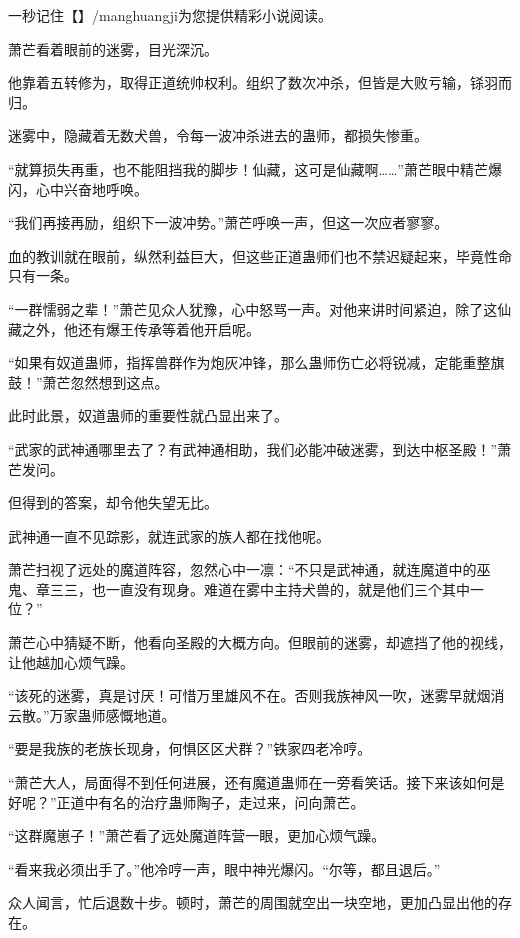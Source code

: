 
\begin{this_body}

一秒记住【】/manghuangji为您提供精彩小说阅读。

萧芒看着眼前的迷雾，目光深沉。

他靠着五转修为，取得正道统帅权利。组织了数次冲杀，但皆是大败亏输，铩羽而归。

迷雾中，隐藏着无数犬兽，令每一波冲杀进去的蛊师，都损失惨重。

“就算损失再重，也不能阻挡我的脚步！仙藏，这可是仙藏啊……”萧芒眼中精芒爆闪，心中兴奋地呼唤。

“我们再接再励，组织下一波冲势。”萧芒呼唤一声，但这一次应者寥寥。

血的教训就在眼前，纵然利益巨大，但这些正道蛊师们也不禁迟疑起来，毕竟性命只有一条。

“一群懦弱之辈！”萧芒见众人犹豫，心中怒骂一声。对他来讲时间紧迫，除了这仙藏之外，他还有爆王传承等着他开启呢。

“如果有奴道蛊师，指挥兽群作为炮灰冲锋，那么蛊师伤亡必将锐减，定能重整旗鼓！”萧芒忽然想到这点。

此时此景，奴道蛊师的重要性就凸显出来了。

“武家的武神通哪里去了？有武神通相助，我们必能冲破迷雾，到达中枢圣殿！”萧芒发问。

但得到的答案，却令他失望无比。

武神通一直不见踪影，就连武家的族人都在找他呢。

萧芒扫视了远处的魔道阵容，忽然心中一凛：“不只是武神通，就连魔道中的巫鬼、章三三，也一直没有现身。难道在雾中主持犬兽的，就是他们三个其中一位？”

萧芒心中猜疑不断，他看向圣殿的大概方向。但眼前的迷雾，却遮挡了他的视线，让他越加心烦气躁。

“该死的迷雾，真是讨厌！可惜万里雄风不在。否则我族神风一吹，迷雾早就烟消云散。”万家蛊师感慨地道。

“要是我族的老族长现身，何惧区区犬群？”铁家四老冷哼。

“萧芒大人，局面得不到任何进展，还有魔道蛊师在一旁看笑话。接下来该如何是好呢？”正道中有名的治疗蛊师陶子，走过来，问向萧芒。

“这群魔崽子！”萧芒看了远处魔道阵营一眼，更加心烦气躁。

“看来我必须出手了。”他冷哼一声，眼中神光爆闪。“尔等，都且退后。”

众人闻言，忙后退数十步。顿时，萧芒的周围就空出一块空地，更加凸显出他的存在。


\end{this_body}
